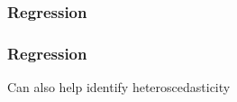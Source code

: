 \documentclass[handout]{beamer}
\begin{document}
   \begin{frame}
   \frametitle{Regression}
   \begin{center}
   \end{center}

   \end{frame}



   \begin{frame}
   \frametitle{Regression}
   \begin{center}
   \end{center}
   Can also help identify heteroscedasticity
   \end{frame}


   \begin{frame} 

   \end{frame}

   
\end{document}
